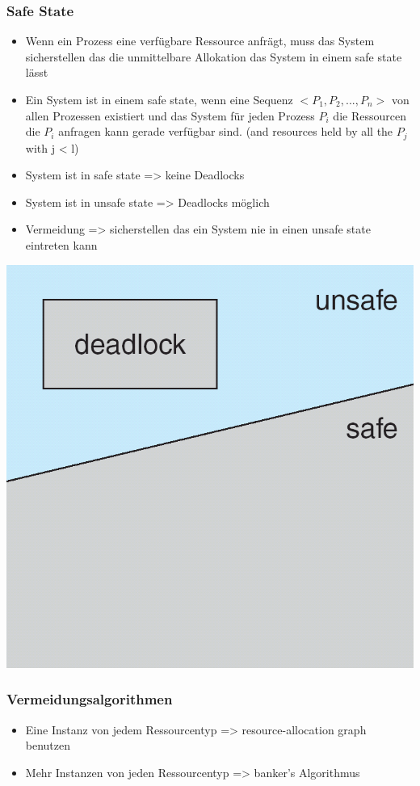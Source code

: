 \documentclass[a4paper]{scrreprt}
\begin{document}
			\subsubsection{Safe State}
				\begin{itemize}
					\item Wenn ein Prozess eine verfügbare Ressource anfrägt, muss das System sicherstellen das die unmittelbare Allokation das System in einem safe state lässt
					\item Ein System ist in einem safe state, wenn eine Sequenz $<P_1, P_2, ...,P_n>$ von allen Prozessen existiert und das System für jeden Prozess $P_i$ die Ressourcen die $P_i$ anfragen kann gerade verfügbar sind. (and resources held by all the $P_j$ with j < l)
				\end{itemize}
				\begin{itemize}
					\item System ist in safe state => keine Deadlocks
					\item System ist in unsafe state => Deadlocks möglich
					\item Vermeidung => sicherstellen das ein System nie in einen unsafe state eintreten kann
				\end{itemize}
				\includegraphics[scale=0.15]{graphics/state.png}
			
			\subsubsection{Vermeidungsalgorithmen}
				\begin{itemize}
					\item Eine Instanz von jedem Ressourcentyp => resource-allocation graph benutzen
					\item Mehr Instanzen von jeden Ressourcentyp => banker's Algorithmus
				\end{itemize}
\end{document}
